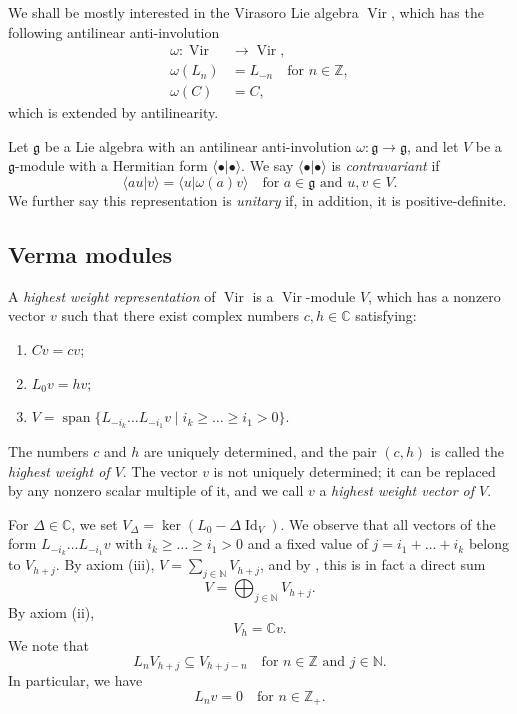\documentclass[a4paper, 12pt, reqno]{amsart}
\theoremstyle{remark}
\DeclareMathOperator{\Vir}{Vir}
\DeclareMathOperator{\Id}{Id}
\DeclareMathOperator{\vspan}{span}
\begin{document}
We shall be mostly interested in the Virasoro Lie algebra $\Vir$, which has the following antilinear anti-involution
\begin{align*}
  \omega: \Vir &\to \Vir, \\
  \omega(L_n) &= L_{-n} \quad \text{for $n \in \mathbb{Z}$}, \\
  \omega(C) &= C,
\end{align*}
which is extended by antilinearity.

Let $\mathfrak{g}$ be a Lie algebra with an antilinear anti-involution $\omega: \mathfrak{g} \to \mathfrak{g}$, and let $V$ be a $\mathfrak{g}$-module with a Hermitian form $\langle\bullet| \bullet\rangle$.
We say $\langle\bullet| \bullet\rangle$ is \emph{contravariant} if
\begin{equation*}
  \langle au| v\rangle = \langle u| \omega(a)v\rangle \quad \text{for $a \in \mathfrak{g}$ and $u, v \in V$}.
\end{equation*}
We further say this representation is \emph{unitary} if, in addition, it is positive-definite.

\subsection{Verma modules}
\label{sec:verma-modules}

A \emph{highest weight representation} of $\Vir$ is a $\Vir$-module $V$, which has a nonzero vector $v$ such that there exist complex numbers $c, h \in \mathbb{C}$ satisfying:
\begin{enumerate}
\item $Cv = cv$;
\item $L_0v = hv$;
\item $V = \vspan\{L_{-i_k}\dots L_{-i_1}v \mid i_k \ge \dots \ge i_1 > 0\}$.
\end{enumerate}
The numbers $c$ and $h$ are uniquely determined, and the pair $(c, h)$ is called the \emph{highest weight of $V$}.
The vector $v$ is not uniquely determined; it can be replaced by any nonzero scalar multiple of it, and we call $v$ a \emph{highest weight vector of $V$}.

For $\Delta \in \mathbb{C}$, we set $V_{\Delta} = \ker(L_0 - \Delta\Id_V)$.
We observe that all vectors of the form $L_{-i_k}\dots L_{-i_1}v$ with $i_k \ge \dots \ge i_1 > 0$ and a fixed value of $j = i_1 + \dots + i_k$ belong to $V_{h + j}$.
By axiom (iii), $V = \sum_{j \in \mathbb{N}}V_{h + j}$, and by , this is in fact a direct sum
\begin{equation}
  \label{eq:34}
  V = \bigoplus_{j \in \mathbb{N}}V_{h + j}.
\end{equation}
By axiom (ii),
\begin{equation*}
  V_h = \mathbb{C}v.
\end{equation*}
We note that
\begin{equation*}
  L_nV_{h + j} \subseteq V_{h + j - n} \quad \text{for $n \in \mathbb{Z}$ and $j \in \mathbb{N}$}.
\end{equation*}
In particular, we have
\begin{equation}
  \label{eq:35}
  L_nv = 0 \quad \text{for $n \in \mathbb{Z}_+$}.
\end{equation}
\end{document}
